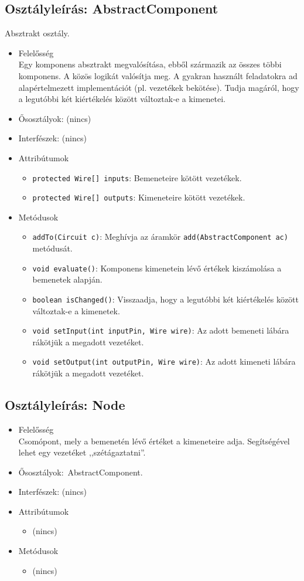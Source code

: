 \subsection{Osztályleírás: \bf AbstractComponent}
Absztrakt osztály.
\begin{itemize}
\item Felelősség\\
Egy komponens absztrakt megvalósítása, ebből származik az összes többi  komponens. A közös logikát valósítja meg. A gyakran használt feladatokra ad alapértelmezett implementációt (pl. vezetékek bekötése). Tudja magáról, hogy a legutóbbi két kiértékelés között változtak-e a kimenetei.
\item Ősosztályok: (nincs)
\item Interfészek: (nincs)
\item Attribútumok $\ $
\begin{itemize}
	\item \texttt{protected Wire[] inputs}: Bemeneteire kötött vezetékek.
	\item \texttt{protected Wire[] outputs}: Kimeneteire kötött vezetékek.
\end{itemize}
\item Metódusok$\ $
\begin{itemize}
	\item \texttt{addTo(Circuit c)}: Meghívja az áramkör \texttt{add(AbstractComponent ac)} metódusát.
	\item \texttt{void evaluate()}: Komponens kimenetein lévő értékek kiszámolása a bemenetek alapján.
	\item \texttt{boolean isChanged()}: Visszaadja, hogy a legutóbbi két kiértékelés között változtak-e a kimenetek.
	\item \texttt{void setInput(int inputPin, Wire wire)}: Az adott bemeneti lábára rákötjük a megadott vezetéket.
	\item \texttt{void setOutput(int outputPin, Wire wire)}: Az adott kimeneti lábára rákötjük a megadott vezetéket.
\end{itemize}
\end{itemize}

\subsection{Osztályleírás: \bf Node}
\begin{itemize}
\item Felelősség\\
Csomópont, mely a bemenetén lévő értéket a kimeneteire adja. Segítségével lehet egy vezetéket ,,szétágaztatni''.
\item Ősosztályok:\ AbstractComponent.
\item Interfészek: (nincs)
\item Attribútumok $\ $
\begin{itemize}
\item (nincs)
\end{itemize}
\item Metódusok$\ $
\begin{itemize}
\item (nincs)
\end{itemize}
\end{itemize}

